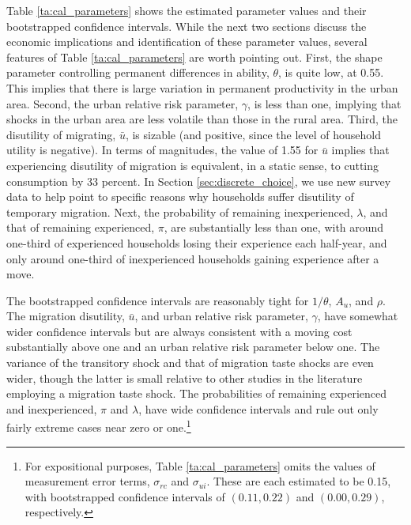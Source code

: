 \documentclass[12pt,pdftex]{article}
\begin{document}
Table \ref{ta:cal_parameters} shows the estimated parameter values and their bootstrapped confidence intervals. While the next two sections discuss the economic implications and identification of these parameter values, several features of Table \ref{ta:cal_parameters} are worth pointing out. First, the shape parameter controlling permanent differences in ability, $\theta$, is quite low, at 0.55. This implies that there is large variation in permanent productivity in the urban area. Second, the urban relative risk parameter, $\gamma$, is less than one, implying that shocks in the urban area are less volatile than those in the rural area. Third, the disutility of migrating, $\bar u$, is sizable (and positive, since the level of household utility is negative). In terms of magnitudes, the value of 1.55 for $\bar u$ implies that experiencing disutility of migration is equivalent, in a static sense, to cutting consumption by 33 percent. In Section \ref{sec:discrete_choice}, we use new survey data to help point to specific reasons why households suffer disutility of temporary migration. Next, the probability of remaining inexperienced, $\lambda$, and that of remaining experienced, $\pi$, are substantially less than one, with around one-third of experienced households losing their experience each half-year, and only around one-third of inexperienced households gaining experience after a move.

The bootstrapped confidence intervals are reasonably tight for $1/\theta$, $A_u$, and $\rho$. The migration disutility, $\bar u$, and urban relative risk parameter, $\gamma$, have somewhat wider confidence intervals but are always consistent with a moving cost substantially above one and an urban relative risk parameter below one. The variance of the transitory shock and that of migration taste shocks are even wider, though the latter is small relative to other studies in the literature employing a migration taste shock. The probabilities of remaining experienced and inexperienced, $\pi$ and $\lambda$, have wide confidence intervals and rule out only fairly extreme cases near zero or one.\footnote{For expositional purposes, Table \ref{ta:cal_parameters} omits the values of measurement error terms, $\sigma_{rc}$ and $\sigma_{ui}$. These are each estimated to be 0.15, with bootstrapped confidence intervals of $ (0.11, 0.22)$ and $ (0.00, 0.29)$, respectively.}
\end{document}
